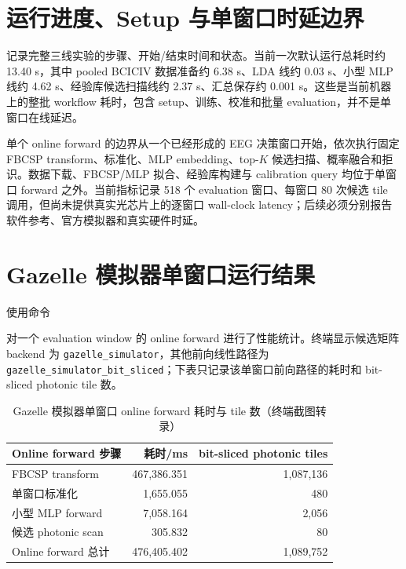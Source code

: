 \documentclass[
    TwoSide=false,
    Degree=graduate,
    GradLevel=master,
    Type=thesis,
    Title={光电混合运动想象脑机接口技术文档}
]{zjuthesis}
\begin{document}
\section{运行进度、Setup 与单窗口时延边界}
 记录完整三线实验的步骤、开始/结束时间和状态。当前一次默认运行总耗时约 13.40 s，其中 pooled BCICIV 数据准备约 6.38 s、LDA 线约 0.03 s、小型 MLP 线约 4.62 s、经验库候选扫描线约 2.37 s、汇总保存约 0.001 s。这些是当前机器上的整批 workflow 耗时，包含 setup、训练、校准和批量 evaluation，并不是单窗口在线延迟。

单个 online forward 的边界从一个已经形成的 EEG 决策窗口开始，依次执行固定 FBCSP transform、标准化、MLP embedding、top-$K$ 候选扫描、概率融合和拒识。数据下载、FBCSP/MLP 拟合、经验库构建与 calibration query 均位于单窗口 forward 之外。当前指标记录 518 个 evaluation 窗口、每窗口 80 次候选 tile 调用，但尚未提供真实光芯片上的逐窗口 wall-clock latency；后续必须分别报告软件参考、官方模拟器和真实硬件时延。

\section{Gazelle 模拟器单窗口运行结果}
使用命令
\begin{center}\small
\texttt{}
\end{center}
对一个 evaluation window 的 online forward 进行了性能统计。终端显示候选矩阵 backend 为 \texttt{gazelle\_simulator}，其他前向线性路径为 \texttt{gazelle\_simulator\_bit\_sliced}；下表只记录该单窗口前向路径的耗时和 bit-sliced photonic tile 数。

\begin{table}[H]\centering\small
\caption{Gazelle 模拟器单窗口 online forward 耗时与 tile 数（终端截图转录）}\label{tab:gazelle-online}
\begin{tabularx}{0.94\linewidth}{|X|r|r|}\hline
Online forward 步骤 & 耗时/ms & bit-sliced photonic tiles \\ \hline
FBCSP transform & 467,386.351 & 1,087,136 \\ \hline
单窗口标准化 & 1,655.055 & 480 \\ \hline
小型 MLP forward & 7,058.164 & 2,056 \\ \hline
候选 photonic scan & 305.832 & 80 \\ \hline
Online forward 总计 & 476,405.402 & 1,089,752 \\ \hline
\end{tabularx}
\end{table}
\end{document}
